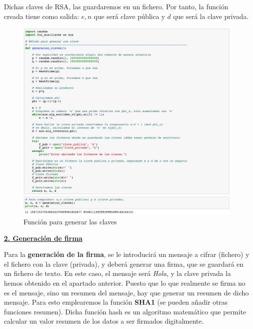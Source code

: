 \documentclass{manual}
\begin{document}
Dichas claves de RSA, las guardaremos en un fichero. Por tanto, la función creada tiene como salida: $e,n$ que será clave pública y $d$ que será la clave privada.

\begin{figure}[H]
	\centering
	\includegraphics[width=145mm]{images/1}
	\caption{Función para generar las claves} 
\end{figure}

\newpage

\underline{\textbf{2. Generación de firma}}

Para la \textbf{generación de la firma}, se le introducirá un mensaje a cifrar (fichero) y el fichero con la clave (privada), y deberá generar una firma, que se guardará en un fichero de texto. En este caso, el mensaje será \textit{Hola}, y la clave privada la hemos obtenido en el apartado anterior. Puesto que lo que realmente se firma no es el mensaje, sino un resumen del mensaje, hay que generar un resumen de dicho mensaje. Para esto emplearemos la función \textbf{SHA1} (se pueden añadir otras funciones resumen). Dicha función hash es un algoritmo matemático que permite calcular un valor resumen de los datos a ser firmados digitalmente.
\end{document}
